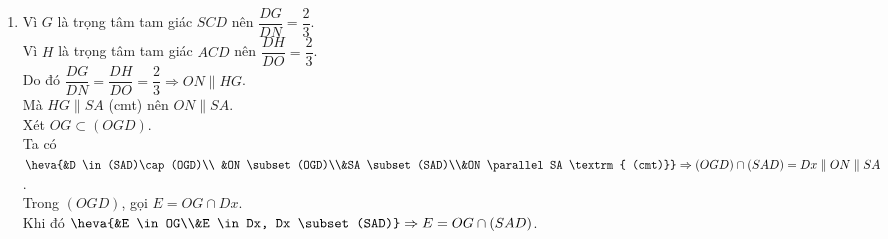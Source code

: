 \begin{bt}
{\begin{enumerate}
			Mặt khác, ta có $H$ là trọng tâm tam giác $ACD$ suy ra $\dfrac{MH}{MA} = \dfrac{1}{3}$.\\
			Do đó $\dfrac{MG}{MS} = \dfrac{MH}{MA} = \dfrac{1}{3} \Rightarrow HG \parallel SA$.
			\item Vì $G$ là trọng tâm tam giác $SCD$ nên $\dfrac{DG}{DN} = \dfrac{2}{3}$.\\
			Vì $H$ là trọng tâm tam giác $ACD$ nên $\dfrac{DH}{DO} = \dfrac{2}{3}$.\\
			Do đó $\dfrac{DG}{DN} = \dfrac{DH}{DO} = \dfrac{2}{3} \Rightarrow ON \parallel HG$.\\
			Mà $HG \parallel SA$ (cmt) nên $ON \parallel SA$.\\
			Xét $OG \subset (OGD)$.\\
			Ta có $\heva{&D \in (SAD)\cap (OGD)\\
			&ON \subset (OGD)\\&SA \subset (SAD)\\&ON \parallel SA \textrm{ (cmt)}} \Rightarrow (OGD)\cap (SAD) = Dx\parallel ON\parallel SA$.\\
			Trong $(OGD)$, gọi $E = OG \cap Dx$.\\
			Khi đó $\heva{&E \in OG\\&E \in Dx, Dx \subset (SAD)} \Rightarrow E = OG \cap (SAD)$.
		\end{enumerate}
	}
\end{bt}